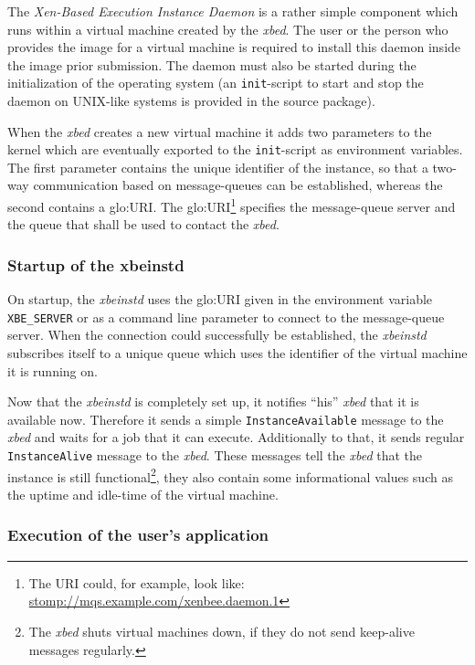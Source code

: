 The  \emph{Xen-Based  Execution  Instance   Daemon}  is  a  rather  simple
component   which  runs   within  a   virtual  machine   created   by  the
\emph{xbed}. The user  or the person who provides the  image for a virtual
machine  is  required  to  install  this daemon  inside  the  image  prior
submission. The daemon  must also be started during  the initialization of
the operating system (an \texttt{init}-script to start and stop the daemon
on UNIX-like systems is provided in the source package).

When the \emph{xbed} creates a  new virtual machine it adds two parameters
to the kernel which are eventually exported to the \texttt{init}-script as
environment variables.  The first parameter contains the unique identifier
of the instance,  so that a two-way communication  based on message-queues
can  be established,  whereas  the second  contains  a \gls{glo:URI}.  The
\gls{glo:URI}\footnote{The   URI   could,    for   example,   look   like:
  \url{stomp://mqs.example.com/xenbee.daemon.1}}       specifies       the
message-queue  server and  the queue  that shall  be used  to  contact the
\emph{xbed}.

\subsubsection{Startup of the xbeinstd}

On  startup,  the \emph{xbeinstd}  uses  the  \gls{glo:URI}  given in  the
environment variable  \texttt{XBE\_SERVER} or as a  command line parameter
to  connect  to  the  message-queue  server.  When  the  connection  could
successfully be  established, the  \emph{xbeinstd} subscribes itself  to a
unique  queue which  uses  the identifier  of  the virtual  machine it  is
running on.

Now that  the \emph{xbeinstd}  is completely set  up, it  notifies ``his''
\emph{xbed}  that  it  is  available  now. Therefore  it  sends  a  simple
\texttt{InstanceAvailable} message to the  \emph{xbed} and waits for a job
that   it  can   execute.   Additionally   to  that,   it   sends  regular
\texttt{InstanceAlive} message to the \emph{xbed}. These messages tell the
\emph{xbed} that the instance is still functional\footnote{The \emph{xbed}
  shuts virtual  machines down,  if they do  not send  keep-alive messages
  regularly.},  they also contain  some informational  values such  as the
uptime and idle-time of the virtual machine.

\subsubsection{Execution of the user's application}

